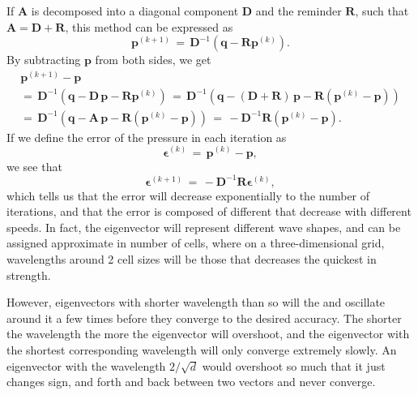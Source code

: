 If $\mathbf{A}$ is decomposed into a diagonal component $\mathbf{D}$ and the reminder $\mathbf{R}$, such that $\mathbf{A} = \mathbf{D} + \mathbf{R}$, this method can be expressed as
%
\begin{equation} \label{eq:jacobi_method}
\mathbf{p}^{(k+1)} \,=\, \mathbf{D}^{-1}(\mathbf{q} - \mathbf{R}\mathbf{p}^{(k)}).
\end{equation}
%
By subtracting $\mathbf{p}$ from both sides, we get
%
\begin{equation}
\begin{array}{c}
\mathbf{p}^{(k+1)} - \mathbf{p} \\
=\, \mathbf{D}^{-1}(\mathbf{q} - \mathbf{D}\,\mathbf{p} - \mathbf{R}\mathbf{p}^{(k)}) \,=\, \mathbf{D}^{-1}(\mathbf{q} - (\mathbf{D} + \mathbf{R})\,\mathbf{p} - \mathbf{R}(\mathbf{p}^{(k)} - \mathbf{p})) \\
=\, \mathbf{D}^{-1}(\mathbf{q} - \mathbf{A}\,\mathbf{p} - \mathbf{R}(\mathbf{p}^{(k)} - \mathbf{p})) \,=\, -\mathbf{D}^{-1}\mathbf{R}(\mathbf{p}^{(k)} - \mathbf{p}).
\end{array}
\end{equation}
%
If we define the error of the pressure in each iteration as
%
\begin{equation} \label{eq:pressure_error}
\mathbf{\epsilon}^{(k)} \,=\, \mathbf{p}^{(k)} - \mathbf{p},
\end{equation}
%
we see that
%
\begin{equation} \label{eq:jacobi_method_error}
\mathbf{\epsilon}^{(k+1)} \,=\, -\mathbf{D}^{-1}\mathbf{R}\mathbf{\epsilon}^{(k)},
\end{equation}
%
which tells us that the error will decrease exponentially to the number of iterations, and that the error is composed of different \eigenvectors that decrease with different speeds. In fact, the eigenvector will represent different wave shapes, and can be assigned approximate \wavelengths in number of cells, where on a three-dimensional grid, wavelengths around 2 cell sizes will be those that decreases the quickest in strength.

However, eigenvectors with shorter wavelength than so will \overshoot the  and oscillate around it a few times before they converge to the desired accuracy. The shorter the wavelength the more the eigenvector will overshoot, and the eigenvector with the shortest corresponding wavelength will only converge extremely slowly. An eigenvector with the wavelength $2/\sqrt{d}$ would overshoot so much that it just changes sign, and \oscillate forth and back between two vectors and never converge.

